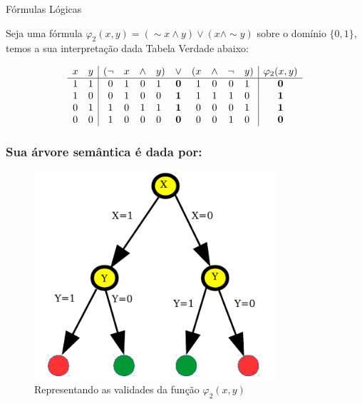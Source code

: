 \documentclass{beamer}
\begin{document}
\begin{frame}
\begin{block}{Fórmulas Lógicas}


Seja uma fórmula $\varphi_2 (x,y) = (\sim x \wedge y)\vee (x \wedge \sim y)$ 
sobre  o domínio $\{0 , 1\}$,
temos a sua interpretação dada Tabela Verdade abaixo:

$$
\begin{array}{cc|c@{}cccc@{}ccc@{}cccc@{}c | c}
x & y & ( &\lnot&x&\land&y&)&\lor&(&x&\land&\lnot&y&) & \varphi_2 (x,y) \\ \hline
1&1&&0&1&0&1&&\mathbf{0}&&1&0&0&1& & \mathbf{0}  \\
1&0&&0&1&0&0&&\mathbf{1}&&1&1&1&0& & \mathbf{1} \\
0&1&&1&0&1&1&&\mathbf{1}&&0&0&0&1& & \mathbf{1} \\
0&0&&1&0&0&0&&\mathbf{0}&&0&0&1&0& & \mathbf{0}
\end{array}
$$

\end{block}

\end{frame}

\begin{frame}
\frametitle{Sua árvore semântica é dada por:}

\begin{figure}[ht!]
 \centering
 \includegraphics[width=0.8\textwidth , height=0.65\textheight]{figures/xy_tree.pdf}
 \caption{Representando as validades da função $\varphi_2 (x,y)$} 
\end{figure}

\end{frame}
\end{document}

